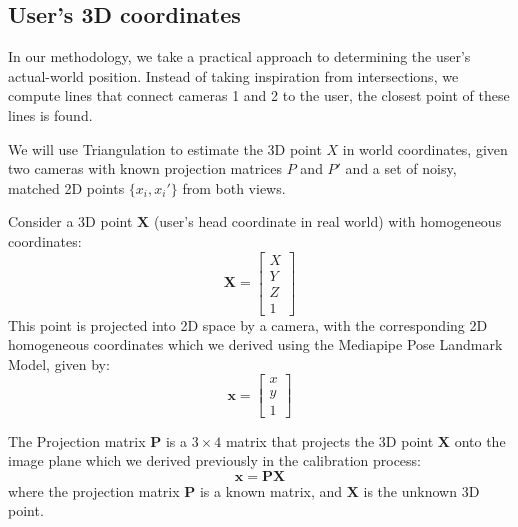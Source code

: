 \subsection{User’s 3D coordinates}

In our methodology, we take a practical approach to determining the user's actual-world position. Instead of taking inspiration from intersections, we compute lines that connect cameras 1 and 2 to the user, the closest point of these lines is found.


We will use Triangulation to estimate the 3D point \( X \) in world coordinates, given two cameras with known projection matrices \( P \) and \( P' \) and a set of noisy, matched 2D points \( \{ x_i, x_i' \} \) from both views.






Consider a 3D point \( \mathbf{X} \) (user's head coordinate in real world) with homogeneous coordinates:
\[
	\mathbf{X} = \begin{bmatrix} X \\ Y \\ Z \\ 1 \end{bmatrix}
\]
This point is projected into 2D space by a camera, with the corresponding 2D homogeneous coordinates which we derived using the Mediapipe Pose Landmark Model,  given by:
\[
	\mathbf{x} = \begin{bmatrix} x \\ y \\ 1 \end{bmatrix}
\]

The Projection matrix \( \mathbf{P} \) is a \( 3 \times 4 \) matrix that projects the 3D point \( \mathbf{X} \) onto the image plane which we derived previously in the calibration process:
\[
	\mathbf{x} = \mathbf{P} \mathbf{X}
\]
where the projection matrix \( \mathbf{P} \) is a known matrix, and \( \mathbf{X} \) is the unknown 3D point.

